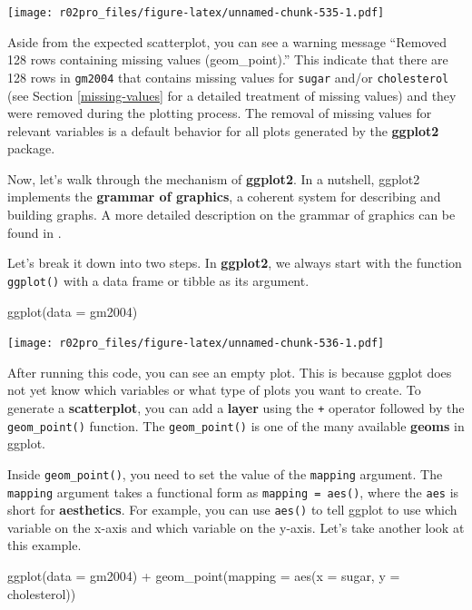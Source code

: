 \documentclass[
]{book}
\newenvironment{Shaded}{\begin{snugshade}}{\end{snugshade}}
\newcommand{\AttributeTok}[1]{\textcolor[rgb]{0.77,0.63,0.00}{#1}}
\newcommand{\FunctionTok}[1]{\textcolor[rgb]{0.00,0.00,0.00}{#1}}
\newcommand{\NormalTok}[1]{#1}
\newcommand{\SpecialCharTok}[1]{\textcolor[rgb]{0.00,0.00,0.00}{#1}}
\begin{document}
\texttt{[image: r02pro\_files/figure-latex/unnamed-chunk-535-1.pdf]}

Aside from the expected scatterplot, you can see a warning message ``Removed 128 rows containing missing values (geom\_point).'' This indicate that there are 128 rows in \texttt{gm2004} that contains missing values for \texttt{sugar} and/or \texttt{cholesterol} (see Section \ref{missing-values} for a detailed treatment of missing values) and they were removed during the plotting process. The removal of missing values for relevant variables is a default behavior for all plots generated by the \textbf{ggplot2} package.

Now, let's walk through the mechanism of \textbf{ggplot2}. In a nutshell, ggplot2 implements the \textbf{grammar of graphics}, a coherent system for describing and building graphs. A more detailed description on the grammar of graphics can be found in \citet{wickham2010layered}.

Let's break it down into two steps. In \textbf{ggplot2}, we always start with the function \texttt{ggplot()} with a data frame or tibble as its argument.

\begin{Shaded}
\begin{Highlighting}[]
\FunctionTok{ggplot}\NormalTok{(}\AttributeTok{data =}\NormalTok{ gm2004)}
\end{Highlighting}
\end{Shaded}

\texttt{[image: r02pro\_files/figure-latex/unnamed-chunk-536-1.pdf]}

After running this code, you can see an empty plot. This is because ggplot does not yet know which variables or what type of plots you want to create. To generate a \textbf{scatterplot}, you can add a \textbf{layer} using the \texttt{+} operator followed by the \texttt{geom\_point()} function. The \texttt{geom\_point()} is one of the many available \textbf{geoms} in ggplot.

Inside \texttt{geom\_point()}, you need to set the value of the \texttt{mapping} argument. The \texttt{mapping} argument takes a functional form as \texttt{mapping\ =\ aes()}, where the \texttt{aes} is short for \textbf{aesthetics}. For example, you can use \texttt{aes()} to tell ggplot to use which variable on the x-axis and which variable on the y-axis. Let's take another look at this example.

\begin{Shaded}
\begin{Highlighting}[]
\FunctionTok{ggplot}\NormalTok{(}\AttributeTok{data =}\NormalTok{ gm2004) }\SpecialCharTok{+} 
  \FunctionTok{geom\_point}\NormalTok{(}\AttributeTok{mapping =} \FunctionTok{aes}\NormalTok{(}\AttributeTok{x =}\NormalTok{ sugar, }
                           \AttributeTok{y =}\NormalTok{ cholesterol))}
\end{Highlighting}
\end{Shaded}
\end{document}
